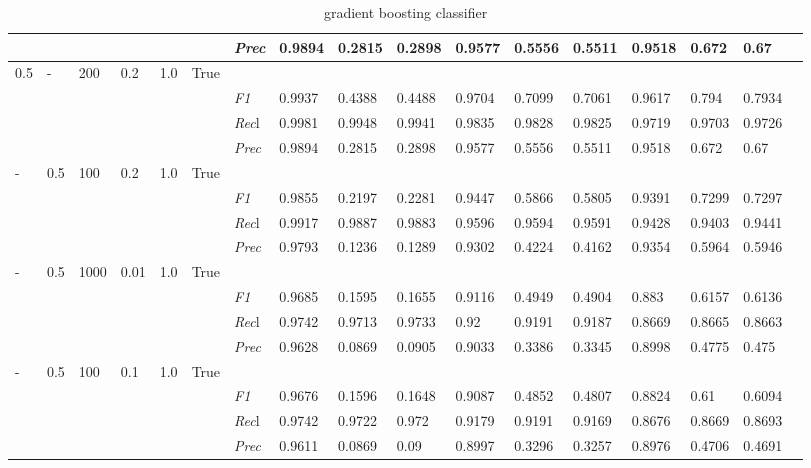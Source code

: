 \begin{table}[]
\begin{tabularx}{\textwidth}{XXXXXX|X|XXX|XXX|XXXX}
    & & & & & & \textit{Prec} & 0.9894 & 0.2815 & 0.2898 & 0.9577 & 0.5556 & 0.5511 & 0.9518 & 0.672 & 0.67 \\ \midrule
    0.5 & - & 200 & 0.2 & 1.0 &True & & & & & & & & & \\
    & & & & & & \textit{F1} & 0.9937 & 0.4388 & 0.4488 & 0.9704 & 0.7099        & 0.7061        & 0.9617        & 0.794        & 0.7934        \\
    & & & & & & \textit{Rec}l & 0.9981 & 0.9948 & 0.9941    & 0.9835 & 0.9828    & 0.9825    & 0.9719    & 0.9703    & 0.9726    \\
    & & & & & & \textit{Prec} & 0.9894 & 0.2815 & 0.2898 & 0.9577 & 0.5556 & 0.5511 & 0.9518 & 0.672 & 0.67 \\ \midrule
    - & 0.5 & 100 & 0.2 & 1.0 &True & & & & & & & & & \\
    & & & & & & \textit{F1} & 0.9855 & 0.2197 & 0.2281 & 0.9447 & 0.5866        & 0.5805        & 0.9391        & 0.7299        & 0.7297        \\
    & & & & & & \textit{Rec}l & 0.9917 & 0.9887 & 0.9883    & 0.9596 & 0.9594    & 0.9591    & 0.9428    & 0.9403    & 0.9441    \\
    & & & & & & \textit{Prec} & 0.9793 & 0.1236 & 0.1289 & 0.9302 & 0.4224 & 0.4162 & 0.9354 & 0.5964 & 0.5946 \\ \midrule
    - & 0.5 & 1000 & 0.01 & 1.0 &True & & & & & & & & & \\
    & & & & & & \textit{F1} & 0.9685 & 0.1595 & 0.1655 & 0.9116 & 0.4949        & 0.4904        & 0.883        & 0.6157        & 0.6136        \\
    & & & & & & \textit{Rec}l & 0.9742 & 0.9713 & 0.9733    & 0.92 & 0.9191    & 0.9187    & 0.8669    & 0.8665    & 0.8663    \\
    & & & & & & \textit{Prec} & 0.9628 & 0.0869 & 0.0905 & 0.9033 & 0.3386 & 0.3345 & 0.8998 & 0.4775 & 0.475 \\ \midrule
    - & 0.5 & 100 & 0.1 & 1.0 &True & & & & & & & & & \\
    & & & & & & \textit{F1} & 0.9676 & 0.1596 & 0.1648 & 0.9087 & 0.4852        & 0.4807        & 0.8824        & 0.61        & 0.6094        \\
    & & & & & & \textit{Rec}l & 0.9742 & 0.9722 & 0.972    & 0.9179 & 0.9191    & 0.9169    & 0.8676    & 0.8669    & 0.8693    \\
    & & & & & & \textit{Prec} & 0.9611 & 0.0869 & 0.09 & 0.8997 & 0.3296 & 0.3257 & 0.8976 & 0.4706 & 0.4691 \\ \midrule
    \end{tabularx}
    \caption{gradient boosting classifier}
    \label{tab:all_results_gradient_boosting_classifier}
    \end{table}
    
